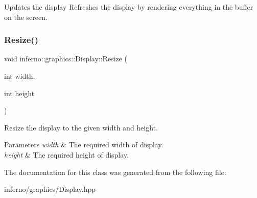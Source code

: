 Updates the display Refreshes the display by rendering everything in the buffer on the screen. 

\mbox{\label{classinferno_1_1graphics_1_1_display_abb7ee350b8273145d1b9a4e5c3c73b58}} 
\subsubsection{\texorpdfstring{Resize()}{Resize()}}
{\footnotesize\ttfamily void inferno\+::graphics\+::\+Display\+::\+Resize (\begin{DoxyParamCaption}\item[{int}]{width,  }\item[{int}]{height }\end{DoxyParamCaption})\hspace{0.3cm}{\ttfamily [inline]}}



Resize the display to the given width and height. 


\begin{DoxyParams}{Parameters}
{\em width} & The required width of display. \\
\hline
{\em height} & The required height of display. \\
\hline
\end{DoxyParams}


The documentation for this class was generated from the following file\+:\begin{DoxyCompactItemize}
\item 
inferno/graphics/Display.\+hpp\end{DoxyCompactItemize}
